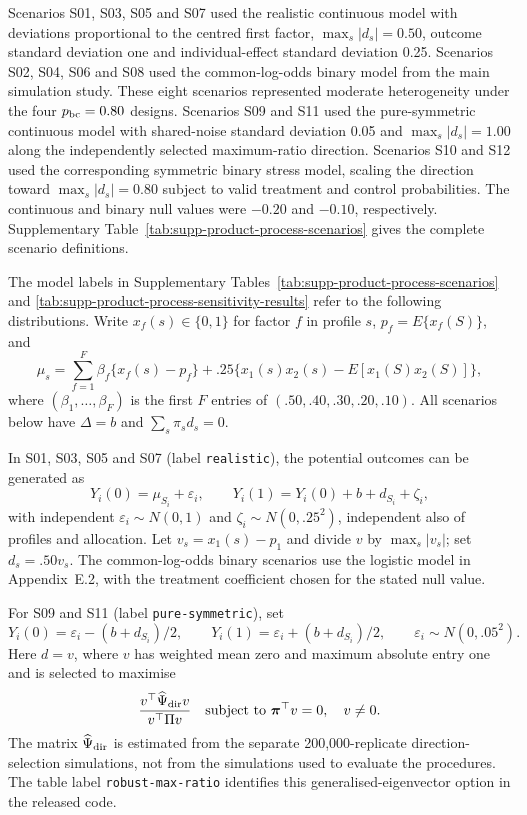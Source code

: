 \documentclass[12pt,a4paper]{article}
\theoremstyle{definition}
\theoremstyle{remark}\newtheorem{remark}{Remark}
\numberwithin{equation}{section}
\begin{document}
Scenarios S01, S03, S05 and S07 used the realistic continuous model with deviations proportional to the centred first factor, $\max_s|d_s|=0.50$, outcome standard deviation one and individual-effect standard deviation 0.25. Scenarios S02, S04, S06 and S08 used the common-log-odds binary model from the main simulation study. These eight scenarios represented moderate heterogeneity under the four $p_{\rm bc}=0.80$ designs. Scenarios S09 and S11 used the pure-symmetric continuous model with shared-noise standard deviation 0.05 and $\max_s|d_s|=1.00$ along the independently selected maximum-ratio direction. Scenarios S10 and S12 used the corresponding symmetric binary stress model, scaling the direction toward $\max_s|d_s|=0.80$ subject to valid treatment and control probabilities. The continuous and binary null values were $-0.20$ and $-0.10$, respectively. Supplementary Table~\ref{tab:supp-product-process-scenarios} gives the complete scenario definitions.


The model labels in Supplementary Tables~\ref{tab:supp-product-process-scenarios} and \ref{tab:supp-product-process-sensitivity-results} refer to the following distributions. Write $x_f(s)\in\{0,1\}$ for factor $f$ in profile $s$, $p_f=E\{x_f(S)\}$, and
\[
 \mu_s=\sum_{f=1}^F\beta_f\{x_f(s)-p_f\}
       +.25\{x_1(s)x_2(s)-E[x_1(S)x_2(S)]\},
\]
where $(\beta_1,\ldots,\beta_F)$ is the first $F$ entries of $(.50,.40,.30,.20,.10)$. All scenarios below have $\Delta=b$ and $\sum_s\pi_s d_s=0$.

In S01, S03, S05 and S07 (label \texttt{realistic}), the potential outcomes can be generated as
\[
 Y_i(0)=\mu_{S_i}+\varepsilon_i,\qquad
 Y_i(1)=Y_i(0)+b+d_{S_i}+\zeta_i,
\]
with independent $\varepsilon_i\sim N(0,1)$ and $\zeta_i\sim N(0,.25^2)$, independent also of profiles and allocation. Let $v_s=x_1(s)-p_1$ and divide $v$ by $\max_s|v_s|$; set $d_s=.50v_s$. The common-log-odds binary scenarios use the logistic model in Appendix~E.2, with the treatment coefficient chosen for the stated null value.

For S09 and S11 (label \texttt{pure-symmetric}), set
\[
 Y_i(0)=\varepsilon_i-(b+d_{S_i})/2,\qquad
 Y_i(1)=\varepsilon_i+(b+d_{S_i})/2,
 \qquad \varepsilon_i\sim N(0,.05^2).
\]
Here $d=v$, where $v$ has weighted mean zero and maximum absolute entry one and is selected to maximise
\[
 \frac{v^\top\widehat\Psi_{\rm dir}v}{v^\top\Pi v}
 \quad\text{subject to }\bm\pi^\top v=0,\quad v\ne0.
\]
The matrix $\widehat\Psi_{\rm dir}$ is estimated from the separate 200,000-replicate direction-selection simulations, not from the simulations used to evaluate the procedures. The table label \texttt{robust-max-ratio} identifies this generalised-eigenvector option in the released code.
\end{document}
